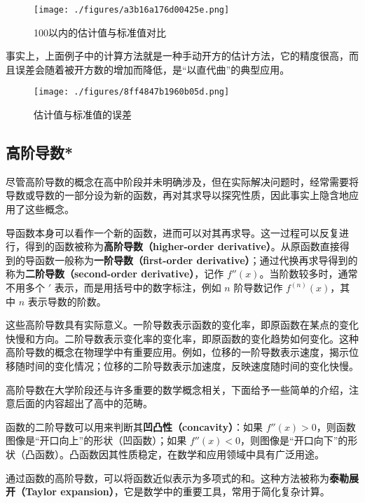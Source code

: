 \begin{figure}[ht]
\centering
\texttt{[image: ./figures/a3b16a176d00425e.png]}
\caption{100以内的估计值与标准值对比} \label{fig_HsDerC_1}
\end{figure}

事实上，上面例子中的计算方法就是一种手动开方的估计方法，它的精度很高，而且误差会随着被开方数的增加而降低，是“以直代曲”的典型应用。

\begin{figure}[ht]
\centering
\texttt{[image: ./figures/8ff4847b1960b05d.png]}
\caption{估计值与标准值的误差} \label{fig_HsDerC_2}
\end{figure}


\subsection{高阶导数*}


尽管高阶导数的概念在高中阶段并未明确涉及，但在实际解决问题时，经常需要将导数或导数的一部分设为新的函数，再对其求导以探究性质，因此事实上隐含地应用了这些概念。

导函数本身可以看作一个新的函数，进而可以对其再求导。这一过程可以反复进行，得到的函数被称为\textbf{高阶导数（higher-order derivative）}。从原函数直接得到的导函数一般称为\textbf{一阶导数（first-order derivative）}；通过代换再求导得到的称为\textbf{二阶导数（second-order derivative）}，记作 $f''(x)$。当阶数较多时，通常不用多个 $'$ 表示，而是用括号中的数字标注，例如 $n$ 阶导数记作 $f^{(n)}(x)$，其中 $n$ 表示导数的阶数。

这些高阶导数具有实际意义。一阶导数表示函数的变化率，即原函数在某点的变化快慢和方向。二阶导数表示变化率的变化率，即原函数的变化趋势如何变化。这种高阶导数的概念在物理学中有重要应用。例如，位移的一阶导数表示速度，揭示位移随时间的变化情况；位移的二阶导数表示加速度，反映速度随时间的变化快慢。

高阶导数在大学阶段还与许多重要的数学概念相关，下面给予一些简单的介绍，注意后面的内容超出了高中的范畴。

函数的二阶导数可以用来判断其\textbf{凹凸性（concavity）}：如果 $f''(x) > 0$，则函数图像是“开口向上”的形状（凹函数）；如果 $f''(x) < 0$，则图像是“开口向下”的形状（凸函数）。凸函数因其性质稳定，在数学和应用领域中具有广泛用途。

通过函数的高阶导数，可以将函数近似表示为多项式的和。这种方法被称为\textbf{泰勒展开（Taylor expansion）}，它是数学中的重要工具，常用于简化复杂计算。

